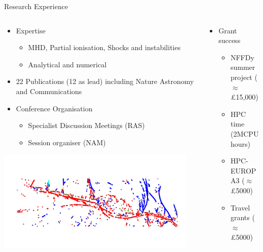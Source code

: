 \documentclass[10pt,aspectratio=169,usenames,dvipsnames]{beamer}
\begin{document}
\begin{frame}{Research Experience}
\begin{columns}
\begin{column}{0.62\textwidth}
\begin{itemize}
    \item Expertise \begin{itemize}
        \item MHD, Partial ionisation, Shocks and instabilities
        \item Analytical and numerical
    \end{itemize}
    \item 22 Publications (12 as lead) including Nature Astronomy and Communications
    \item Conference Organisation \begin{itemize}
        \item Specialist Discussion Meetings (RAS) 
        \item Session organiser (NAM)
    \end{itemize}
\end{itemize}
\includegraphics[width=0.95\textwidth]{2023NAM/Figures/plasmoid.png}
\end{column}
\begin{column}{0.5\textwidth}
\begin{itemize}
    \item Grant success \\ \begin{itemize}
        \item NFFDy summer project ($\approx$ £15,000)
        \item HPC time (2MCPU hours)
        \item HPC-EUROPA3 ($\approx$ £5000)
        \item Travel grants ($\approx$ £5000)

\end{itemize}
\end{itemize}
\end{column}
\end{columns}
\end{frame}
\end{document}
